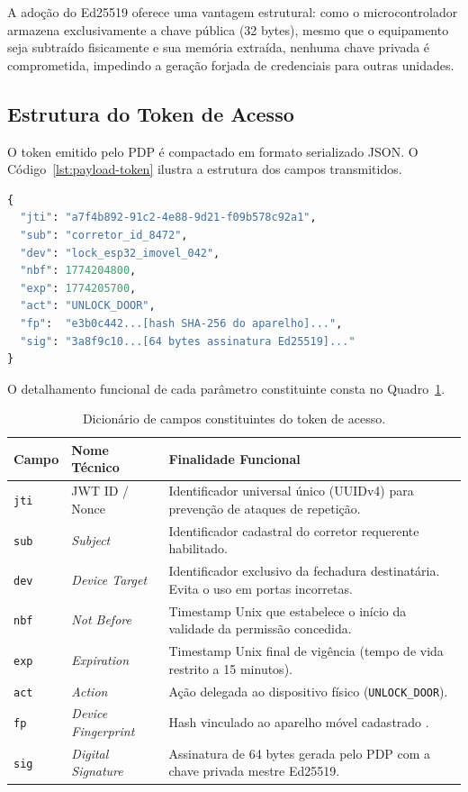 A adoção do Ed25519 oferece uma vantagem estrutural: como o microcontrolador armazena exclusivamente a chave pública (32 bytes), mesmo que o equipamento seja subtraído fisicamente e sua memória extraída, nenhuma chave privada é comprometida, impedindo a geração forjada de credenciais para outras unidades.

\subsection{Estrutura do Token de Acesso}
\label{subsec:estrutura-token}

O token emitido pelo PDP é compactado em formato serializado JSON. O Código~\ref{lst:payload-token} ilustra a estrutura dos campos transmitidos.

\begin{lstlisting}[language=Python, caption={Estrutura formal do payload do token de acesso emitido pelo PDP.}, label={lst:payload-token}]
{
  "jti": "a7f4b892-91c2-4e88-9d21-f09b578c92a1",
  "sub": "corretor_id_8472",
  "dev": "lock_esp32_imovel_042",
  "nbf": 1774204800,
  "exp": 1774205700,
  "act": "UNLOCK_DOOR",
  "fp":  "e3b0c442...[hash SHA-256 do aparelho]...",
  "sig": "3a8f9c10...[64 bytes assinatura Ed25519]..."
}
\end{lstlisting}

O detalhamento funcional de cada parâmetro constituinte consta no Quadro~\ref{quadro:dicionario-token}.

\begin{table}[htbp]
\centering
\footnotesize
\caption{Dicionário de campos constituintes do token de acesso.}
\label{quadro:dicionario-token}
\begin{tabularx}{\textwidth}{p{1.4cm} p{2.8cm} X}
\toprule
\textbf{Campo} & \textbf{Nome Técnico} & \textbf{Finalidade Funcional} \\
\midrule
\texttt{jti} & JWT ID / Nonce & Identificador universal único (UUIDv4) para prevenção de ataques de repetição. \\
\texttt{sub} & \textit{Subject} & Identificador cadastral do corretor requerente habilitado. \\
\texttt{dev} & \textit{Device Target} & Identificador exclusivo da fechadura destinatária. Evita o uso em portas incorretas. \\
\texttt{nbf} & \textit{Not Before} & Timestamp Unix que estabelece o início da validade da permissão concedida. \\
\texttt{exp} & \textit{Expiration} & Timestamp Unix final de vigência (tempo de vida restrito a 15 minutos). \\
\texttt{act} & \textit{Action} & Ação delegada ao dispositivo físico (\texttt{UNLOCK\_DOOR}). \\
\texttt{fp} & \textit{Device Fingerprint} & Hash vinculado ao aparelho móvel cadastrado \cite{satanasaowapak2021}. \\
\texttt{sig} & \textit{Digital Signature} & Assinatura de 64 bytes gerada pelo PDP com a chave privada mestre Ed25519. \\
\bottomrule
\end{tabularx}
\end{table}

